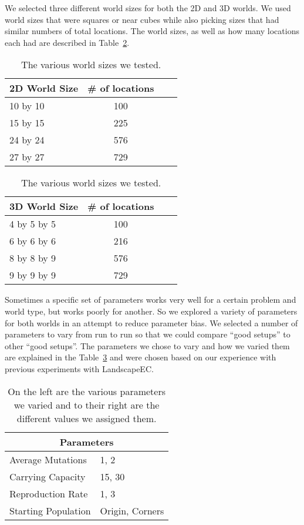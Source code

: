 \documentclass[12pt]{article}
\begin{document}
We selected three different world sizes for both the 2D and 3D worlds. We used world sizes that were squares or near cubes while also picking sizes that had similar numbers of total locations. The world sizes, as well as how many locations each had are described in Table~\ref{tab:worldsizes}.

\begin{table}[tb]
\begin{center}
\begin{tabular}{lccl}
	\textbf{2D World Size} & \textbf{\# of locations} \\ \hline
	10 by 10 & 100 \\
	15 by 15 & 225 \\
	24 by 24 & 576 \\
	27 by 27 & 729 \\
\end{tabular}
\begin{tabular}{lccl}
	\textbf{3D World Size} & \textbf{\# of locations} \\ \hline
	4 by 5 by 5 & 100 \\
	6 by 6 by 6 & 216 \\
	8 by 8 by 9 & 576 \\
	9 by 9 by 9 & 729 \\
\end{tabular}
\caption{The various world sizes we tested.}
\label{tab:worldsizes}
\end{center}
\end{table}

Sometimes a specific set of parameters works very well for a certain problem and world type, but works poorly for another. So we explored a variety of parameters for both worlds in an attempt to reduce parameter bias. We selected a number of parameters to vary from run to run so that we could compare ``good setups'' to other ``good setups''. The parameters we chose to vary and how we varied them are explained in the Table~\ref{tab:parameters} and were chosen based on our experience with previous experiments with LandscapeEC.

\begin{table}[tb]
\begin{center}
\begin{tabular}{|l|l|}
	\hline
	\multicolumn{2}{|c|}{Parameters} \\
	\hline
	Average Mutations & 1, 2 \\
	Carrying Capacity & 15, 30 \\
	Reproduction Rate & 1, 3 \\
	Starting Population & Origin, Corners \\
	\hline
\end{tabular}
\caption{On the left are the various parameters we varied and to their right are the different values we assigned them.}
\label{tab:parameters}
\end{center}
\end{table}
\end{document}
